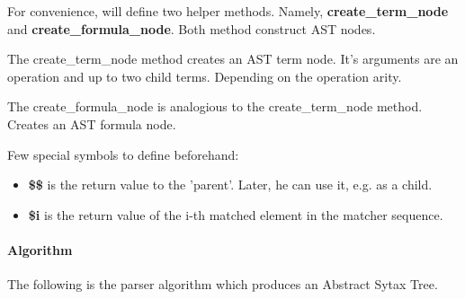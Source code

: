 \documentclass{article}
\begin{document}
			For convenience, will define two helper methods. Namely, \textbf{create\_term\_node} and \textbf{create\_formula\_node}. Both method construct AST nodes.

			The create\_term\_node method creates an AST term node. It's arguments are an operation and up to two child terms. Depending on the operation arity.

			The create\_formula\_node is analogious to the create\_term\_node method. Creates an AST formula node.

			Few special symbols to define beforehand:
			\begin{itemize}
				\item \textbf{\$\$} is the return value to the 'parent'. Later, he can use it, e.g. as a child.
				\item \textbf{\$i} is the return value of the i-th matched element in the matcher sequence.
			\end{itemize}

		\paragraph{Algorithm} The following is the parser algorithm which produces an Abstract Sytax Tree.
\end{document}
